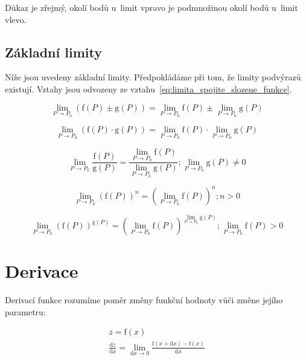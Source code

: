 Důkaz je zřejmý, okolí bodů u~limit vpravo je podmnožinou okolí bodů u~limit vlevo.

\subsection{Základní limity}

Níže jsou uvedeny základní limity. Předpokládáme při tom, že limity podvýrazů existují. Vztahy jsou odvozeny ze vztahu~\eqref{eq:limita_spojite_slozene_funkce}.

\begin{equation}
\lim_{P \to P_0} \left(\mathrm{f}(P) \pm \mathrm{g}(P) \right) = \lim_{P \to P_0} \mathrm{f}(P) \pm \lim_{P \to P_0} \mathrm{g}(P)
\end{equation}

\begin{equation}
\lim_{P \to P_0} \left(\mathrm{f}(P) \cdot \mathrm{g}(P) \right) = \lim_{P \to P_0} \mathrm{f}(P) \cdot \lim_{P \to P_0} \mathrm{g}(P)
\end{equation}

\begin{equation}
\lim_{P \to P_0} \frac{\mathrm{f}(P)}{\mathrm{g}(P)} = \frac{\lim_{P \to P_0} \mathrm{f}(P)}{\lim_{P \to P_0} \mathrm{g}(P)}; \lim_{P \to P_0} \mathrm{g}(P) \neq 0
\end{equation}

\begin{equation}
\lim_{P \to P_0} \left(\mathrm{f}(P)\right)^n = \left(\lim_{P \to P_0} \mathrm{f}(P)\right)^n; n > 0
\end{equation}

\begin{equation}
\lim_{P \to P_0} \left(\mathrm{f}(P)\right)^{\mathrm{g}(P)} = \left(\lim_{P \to P_0} \mathrm{f}(P)\right)^{\lim_{P \to P_0} \mathrm{g}(P)}; \lim_{P \to P_0} \mathrm{f}(P) > 0
\end{equation}

\section{Derivace}

Derivací funkce rozumíme poměr změny funkční hodnoty vůči změne jejího parametru:

\begin{equation}
\label{eq:definice_derivace}
\begin{split}
z =\mathrm{f}(x) \\
\frac{\mathrm{d}z}{\mathrm{d}x} = \lim_{\mathrm{d}x \to 0} \frac{\mathrm{f}(x + \mathrm{d}x) - \mathrm{f}(x)}{\mathrm{d}x}
\end{split}
\end{equation}

